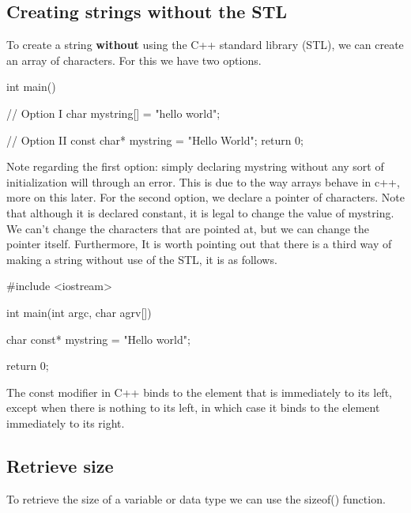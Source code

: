 \documentclass{report}
\begin{document}
    \pagebreak
    \subsection{Creating strings without the STL}
    To create a string \textbf{without} using the C++ standard library (STL), we can create an array of characters. For this we have two options.
    \bigbreak \noindent 
    
    \begin{cppcode}
int main() {

    // Option I
    char mystring[] = "hello world";

    // Option II
    const char* mystring = "Hello World";
    return 0;
}
    \end{cppcode}
    
    \bigbreak \noindent 
    Note regarding the first option: simply declaring mystring without any sort of initialization will through an error. This is due to the way arrays behave in c++, more on this later.
    \bigbreak \noindent 
    For the second option, we declare a pointer of characters. Note that although it is declared constant, it is legal to change the value of mystring. We can't change the characters that are pointed at, but we can change the pointer itself.
    \bigbreak \noindent 
    Furthermore, It is worth pointing out that there is a third way of making a string without use of the STL, it is as follows.
    \bigbreak \noindent 
    
    \begin{cppcode}
#include <iostream>

int main(int argc, char agrv[]){

    char const* mystring = "Hello world";

    return 0;
}
    \end{cppcode}
    
    \bigbreak \noindent 
    The const modifier in C++ binds to the element that is immediately to its left, except when there is nothing to its left, in which case it binds to the element immediately to its right.
    \bigbreak \noindent 


    \pagebreak
    \subsection{Retrieve size}
    \bigbreak \noindent 
    To retrieve the size of a variable or data type we can use the sizeof() function.
    \bigbreak \noindent 
    
\end{document}
